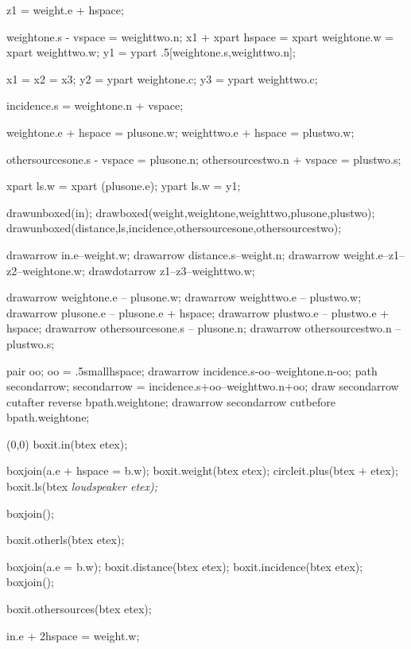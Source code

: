 \documentclass[a4paper]{article}
\newcommand{\fontsmall}{\normalfont\scriptsize\sffamily\itshape}
\begin{document}
\begin{empfile}
\begin{empdef}[vbap2]
z1 = weight.e + hspace;

weightone.s - vspace = weighttwo.n;
x1 + xpart hspace = xpart weightone.w = xpart weighttwo.w;
y1 = ypart .5[weightone.s,weighttwo.n];

x1 = x2 = x3;
y2 = ypart weightone.c;
y3 = ypart weighttwo.c;

incidence.s = weightone.n + vspace;

weightone.e + hspace = plusone.w;
weighttwo.e + hspace = plustwo.w;

othersourcesone.s - vspace = plusone.n;
othersourcestwo.n + vspace = plustwo.s;

xpart ls.w = xpart (plusone.e);
ypart ls.w = y1;

drawunboxed(in);
drawboxed(weight,weightone,weighttwo,plusone,plustwo);
drawunboxed(distance,ls,incidence,othersourcesone,othersourcestwo);

drawarrow in.e--weight.w;
drawarrow distance.s--weight.n;
drawarrow weight.e--z1--z2--weightone.w;
drawdotarrow z1--z3--weighttwo.w;

drawarrow weightone.e -- plusone.w;
drawarrow weighttwo.e -- plustwo.w;
drawarrow plusone.e -- plusone.e + hspace;
drawarrow plustwo.e -- plustwo.e + hspace;
drawarrow othersourcesone.s -- plusone.n;
drawarrow othersourcestwo.n -- plustwo.s;

pair oo;
oo = .5smallhspace;
drawarrow incidence.s-oo--weightone.n-oo;
path secondarrow;
secondarrow = incidence.s+oo--weighttwo.n+oo;
draw secondarrow cutafter reverse bpath.weightone;
drawarrow secondarrow cutbefore bpath.weightone;

\end{empdef}

\begin{empdef}[aap](0,0)
boxit.in(btex  etex);

boxjoin(a.e + hspace = b.w);
boxit.weight(btex  etex);
circleit.plus(btex $+$ etex);
boxit.ls(btex \fontsmall loudspeaker etex);

boxjoin();

boxit.otherls(btex  etex);

boxjoin(a.e = b.w);
boxit.distance(btex  etex);
boxit.incidence(btex  etex);
boxjoin();

boxit.othersources(btex  etex);

in.e + 2hspace = weight.w;


\end{empdef}
\end{empfile}
\end{document}
